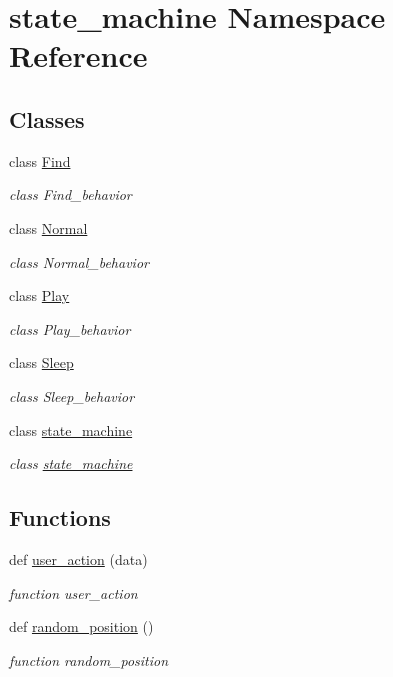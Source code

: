 \hypertarget{namespacestate__machine}{}\section{state\+\_\+machine Namespace Reference}
\label{namespacestate__machine}
\subsection*{Classes}
\begin{DoxyCompactItemize}
\item 
class \hyperlink{classstate__machine_1_1Find}{Find}
\begin{DoxyCompactList}\small\item\em class Find\+\_\+behavior \end{DoxyCompactList}\item 
class \hyperlink{classstate__machine_1_1Normal}{Normal}
\begin{DoxyCompactList}\small\item\em class Normal\+\_\+behavior \end{DoxyCompactList}\item 
class \hyperlink{classstate__machine_1_1Play}{Play}
\begin{DoxyCompactList}\small\item\em class Play\+\_\+behavior \end{DoxyCompactList}\item 
class \hyperlink{classstate__machine_1_1Sleep}{Sleep}
\begin{DoxyCompactList}\small\item\em class Sleep\+\_\+behavior \end{DoxyCompactList}\item 
class \hyperlink{classstate__machine_1_1state__machine}{state\+\_\+machine}
\begin{DoxyCompactList}\small\item\em class \hyperlink{classstate__machine_1_1state__machine}{state\+\_\+machine} \end{DoxyCompactList}\end{DoxyCompactItemize}
\subsection*{Functions}
\begin{DoxyCompactItemize}
\item 
def \hyperlink{namespacestate__machine_abbdd360e43abe493ed21338d848f100f}{user\+\_\+action} (data)
\begin{DoxyCompactList}\small\item\em function user\+\_\+action \end{DoxyCompactList}\item 
def \hyperlink{namespacestate__machine_ad624b5f98b8358f20b7cecc4b88c9f52}{random\+\_\+position} ()
\begin{DoxyCompactList}\small\item\em function random\+\_\+position \end{DoxyCompactList}\end{DoxyCompactItemize}
